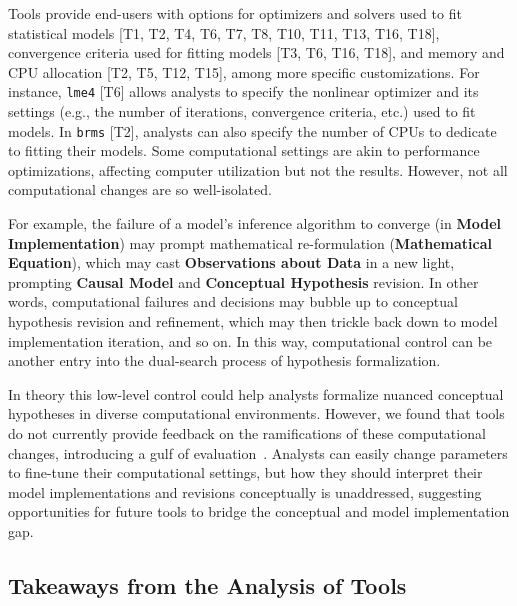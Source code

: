 \vspace{-2mm}
Tools provide end-users with options for optimizers and solvers used to fit
statistical models [T1, T2, T4, T6, T7, T8, T10, T11, T13, T16, T18],
convergence criteria used for fitting
models [T3, T6, T16, T18], and memory and CPU allocation [T2, T5, T12, T15], among more specific
customizations. %
For instance, \texttt{lme4} [T6] allows analysts to specify the nonlinear
optimizer and its settings (e.g., the number of iterations, convergence
criteria, etc.) used to fit models. In \texttt{brms} [T2], analysts can also
specify the number of CPUs to dedicate to fitting their models. Some
computational settings are akin to performance optimizations, affecting computer
utilization but not the results. However, not all computational changes are so
well-isolated.

For example, the failure of a model's inference algorithm to converge (in \textbf{Model Implementation})
may prompt mathematical re-formulation (\textbf{Mathematical Equation}), which
may cast \textbf{Observations about Data} in a new light, prompting
\textbf{Causal Model} and \textbf{Conceptual Hypothesis} revision. In other
words, computational failures and decisions may bubble up to conceptual hypothesis
revision and refinement, which may then trickle back down to model
implementation iteration, and so on. In this way, computational
control can be another entry into the dual-search process of hypothesis formalization. 

In theory this low-level control could help analysts formalize
nuanced conceptual hypotheses in diverse computational environments. However, we found
that tools do not currently provide feedback on the ramifications of these
computational changes, introducing a gulf of evaluation~\cite{norman1986cognitive}. Analysts can
easily change parameters to fine-tune their computational settings, but how they
should interpret their model implementations and revisions conceptually is
unaddressed, suggesting opportunities for future tools to bridge the conceptual
and model implementation gap. 

\vspace{-2mm}
\subsection{Takeaways from the Analysis of Tools}

